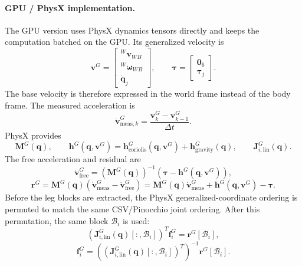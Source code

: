 \documentclass[11pt, a4paper]{article}
\begin{document}
\paragraph{GPU / PhysX implementation.}
The GPU version uses PhysX dynamics tensors directly and keeps the computation
batched on the GPU. Its generalized velocity is
\begin{equation}
    \bm{v}^{G}
    =
    \begin{bmatrix}
        {}^{W}\bm{v}_{WB} \\
        {}^{W}\bm{\omega}_{WB} \\
        \dot{\bm{q}}_j
    \end{bmatrix},
    \qquad
    \bm{\tau}
    =
    \begin{bmatrix}
        \bm{0}_{6} \\
        \bm{\tau}_j
    \end{bmatrix}.
\end{equation}
The base velocity is therefore expressed in the world frame instead of the body
frame. The measured acceleration is
\begin{equation}
    \dot{\bm{v}}^{G}_{\mathrm{meas},k}
    =
    \frac{\bm{v}^{G}_{k}-\bm{v}^{G}_{k-1}}{\Delta t}.
\end{equation}
PhysX provides
\begin{equation}
    \bm{M}^{G}(\bm{q}),
    \qquad
    \bm{h}^{G}(\bm{q},\bm{v}^{G})
    =
    \bm{h}^{G}_{\mathrm{coriolis}}(\bm{q},\bm{v}^{G})
    +
    \bm{h}^{G}_{\mathrm{gravity}}(\bm{q}),
    \qquad
    \bm{J}^{G}_{i,\mathrm{lin}}(\bm{q}).
\end{equation}
The free acceleration and residual are
\begin{equation}
    \dot{\bm{v}}^{G}_{\mathrm{free}}
    =
    \left(\bm{M}^{G}(\bm{q})\right)^{-1}
    \left(
        \bm{\tau}
        -
        \bm{h}^{G}(\bm{q},\bm{v}^{G})
    \right),
\end{equation}
\begin{equation}
    \bm{r}^{G}
    =
    \bm{M}^{G}(\bm{q})
    \left(
        \dot{\bm{v}}^{G}_{\mathrm{meas}}
        -
        \dot{\bm{v}}^{G}_{\mathrm{free}}
    \right)
    =
    \bm{M}^{G}(\bm{q})\dot{\bm{v}}^{G}_{\mathrm{meas}}
    +
    \bm{h}^{G}(\bm{q},\bm{v}^{G})
    -
    \bm{\tau}.
\end{equation}
Before the leg blocks are extracted, the PhysX generalized-coordinate ordering
is permuted to match the same CSV/Pinocchio joint ordering. After this
permutation, the same block $\mathcal{B}_i$ is used:
\begin{equation}
    \left(
        \bm{J}^{G}_{i,\mathrm{lin}}(\bm{q})[:,\mathcal{B}_i]
    \right)^{T}
    \bm{f}^{G}_i
    =
    \bm{r}^{G}[\mathcal{B}_i],
\end{equation}
\begin{equation}
    \bm{f}^{G}_i
    =
    \left(
        \left(
            \bm{J}^{G}_{i,\mathrm{lin}}(\bm{q})[:,\mathcal{B}_i]
        \right)^{T}
    \right)^{-1}
    \bm{r}^{G}[\mathcal{B}_i].
\end{equation}
\end{document}
